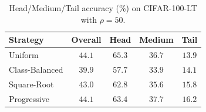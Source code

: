 \begin{table}[htbp]
\centering
\caption{Head/Medium/Tail accuracy (\%) on CIFAR-100-LT with $\rho = 50$.}
\label{tab:hmt_rho50}
\begin{tabular}{lcccc}
\toprule
\textbf{Strategy} & \textbf{Overall} & \textbf{Head} & \textbf{Medium} & \textbf{Tail} \\
\midrule
Uniform & $44.1$ & $65.3$ & $36.7$ & $13.9$ \\
Class-Balanced & $39.9$ & $57.7$ & $33.9$ & $14.1$ \\
Square-Root & $43.0$ & $62.8$ & $35.6$ & $15.8$ \\
Progressive & $44.1$ & $63.4$ & $37.7$ & $16.2$ \\
\bottomrule
\end{tabular}
\end{table}